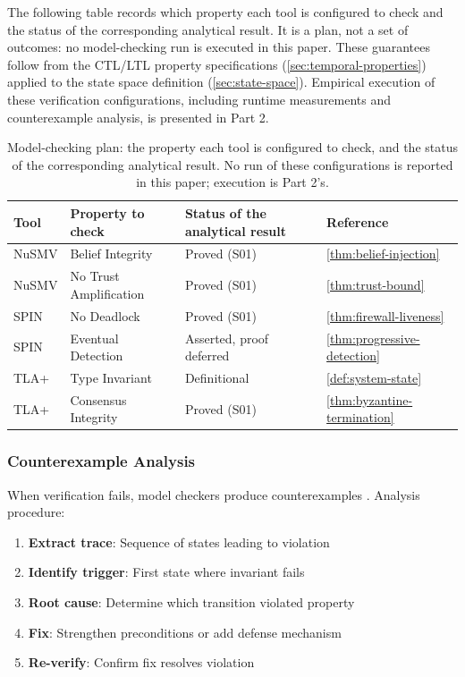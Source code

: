 \documentclass[
]{article}
\begin{document}
The following table records which property each tool is configured to
check and the status of the corresponding analytical result. It is a
plan, not a set of outcomes: no model-checking run is executed in this
paper. These guarantees follow from the CTL/LTL property specifications
(\cref{sec:temporal-properties}) applied to the state space definition
(\cref{sec:state-space}). Empirical execution of these verification
configurations, including runtime measurements and counterexample
analysis, is presented in Part 2.

\begin{table}[htbp]
\centering
\caption{Model-checking plan: the property each tool is configured to check, and
the status of the corresponding analytical result. No run of these configurations
is reported in this paper; execution is Part 2's.}
\label{tab:verification-results}
\begin{tabular}{@{}llll@{}}
\toprule
Tool & Property to check & Status of the analytical result & Reference \\
\midrule
NuSMV & Belief Integrity & Proved (S01) & \cref{thm:belief-injection} \\
NuSMV & No Trust Amplification & Proved (S01) & \cref{thm:trust-bound} \\
SPIN & No Deadlock & Proved (S01) & \cref{thm:firewall-liveness} \\
SPIN & Eventual Detection & Asserted, proof deferred & \cref{thm:progressive-detection} \\
TLA+ & Type Invariant & Definitional & \cref{def:system-state} \\
TLA+ & Consensus Integrity & Proved (S01) & \cref{thm:byzantine-termination} \\
\bottomrule
\end{tabular}
\end{table}

\subsubsection{Counterexample Analysis}\label{sec:counterexample}

When verification fails, model checkers produce counterexamples
\cite{clarke1999model}. Analysis procedure:

\begin{enumerate}
\item \textbf{Extract trace}: Sequence of states leading to violation
\item \textbf{Identify trigger}: First state where invariant fails
\item \textbf{Root cause}: Determine which transition violated property
\item \textbf{Fix}: Strengthen preconditions or add defense mechanism
\item \textbf{Re-verify}: Confirm fix resolves violation
\end{enumerate}
\end{document}
